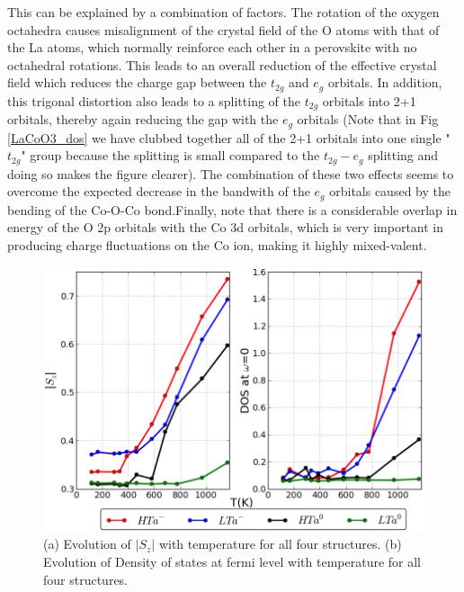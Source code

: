 \documentclass[10pt]{ruthesis}
\begin{document}
{This can be explained by a combination of factors. The rotation of the oxygen octahedra causes misalignment of the crystal field of the O atoms with that of the La atoms, which normally reinforce each other in a  perovskite with no octahedral rotations. This leads to an overall reduction of the effective crystal field which reduces the charge gap between the $t_{2g}$ and $e_g$ orbitals. In addition, this trigonal distortion also leads to a splitting of the $t_{2g}$ orbitals into 2+1 orbitals, thereby again reducing the gap with the $e_g$ orbitals (Note that in Fig \ref{LaCoO3_dos} we have clubbed together all of the 2+1 orbitals into one single "$t_{2g}$" group because the splitting is small compared to the $t_{2g}-e_g$ splitting  and doing so makes the figure clearer). The combination of these two effects seems to overcome the expected decrease in the bandwith of the $e_g$ orbitals caused by the bending of the Co-O-Co bond.Finally, note that there is a considerable overlap in energy of the O 2p orbitals with the Co 3d orbitals, which is very important in producing charge fluctuations on the Co ion, making it highly mixed-valent. 

\setcounter{figure}{4}
\begin{figure}
\begin{center}
\includegraphics[width=\columnwidth]{plots_final/output/fig2.png}
\caption{(a) Evolution of $|S_z|$ with temperature for all four structures. (b) Evolution of Density of states at fermi level with temperature for all four structures.}\label{fig2_spin}
\end{center}
\end{figure}

}
\end{document}

